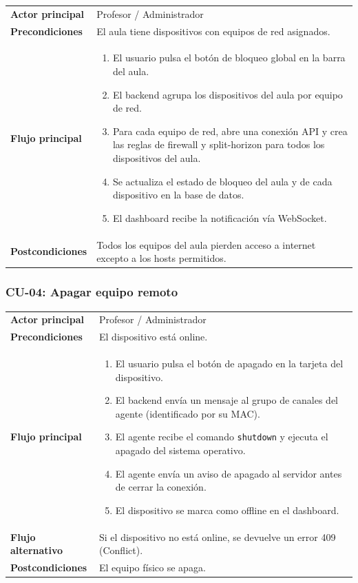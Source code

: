 \documentclass[12pt, a4paper, twoside]{article}
\begin{document}
\begin{tabularx}{\textwidth}{lX}
  \toprule
  \textbf{Actor principal} & Profesor / Administrador \\
  \textbf{Precondiciones}  & El aula tiene dispositivos con equipos de red asignados. \\
  \textbf{Flujo principal}  &
  \begin{enumerate}[nosep]
    \item El usuario pulsa el botón de bloqueo global en la barra del aula.
    \item El backend agrupa los dispositivos del aula por equipo de red.
    \item Para cada equipo de red, abre una conexión API y crea las reglas de firewall y split-horizon para todos los dispositivos del aula.
    \item Se actualiza el estado de bloqueo del aula y de cada dispositivo en la base de datos.
    \item El dashboard recibe la notificación vía WebSocket.
  \end{enumerate} \\
  \textbf{Postcondiciones} & Todos los equipos del aula pierden acceso a internet excepto a los hosts permitidos. \\
  \bottomrule
\end{tabularx}

\subsubsection{CU-04: Apagar equipo remoto}

\begin{tabularx}{\textwidth}{lX}
  \toprule
  \textbf{Actor principal} & Profesor / Administrador \\
  \textbf{Precondiciones}  & El dispositivo está online. \\
  \textbf{Flujo principal}  &
  \begin{enumerate}[nosep]
    \item El usuario pulsa el botón de apagado en la tarjeta del dispositivo.
    \item El backend envía un mensaje al grupo de canales del agente (identificado por su MAC).
    \item El agente recibe el comando \texttt{shutdown} y ejecuta el apagado del sistema operativo.
    \item El agente envía un aviso de apagado al servidor antes de cerrar la conexión.
    \item El dispositivo se marca como offline en el dashboard.
  \end{enumerate} \\
  \textbf{Flujo alternativo} & Si el dispositivo no está online, se devuelve un error 409 (Conflict). \\
  \textbf{Postcondiciones} & El equipo físico se apaga. \\
  \bottomrule
\end{tabularx}
\end{document}

